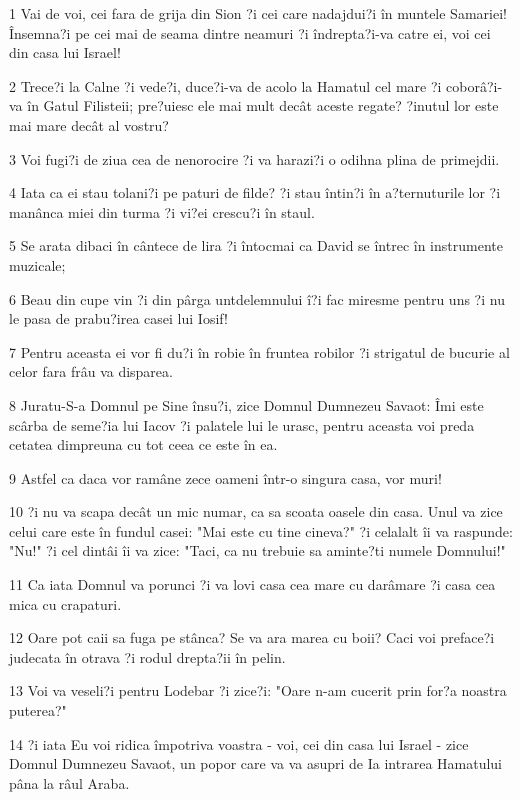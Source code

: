 \par 1 Vai de voi, cei fara de grija din Sion ?i cei care nadajdui?i în muntele Samariei! Însemna?i pe cei mai de seama dintre neamuri ?i îndrepta?i-va catre ei, voi cei din casa lui Israel!
\par 2 Trece?i la Calne ?i vede?i, duce?i-va de acolo la Hamatul cel mare ?i coborâ?i-va în Gatul Filisteii; pre?uiesc ele mai mult decât aceste regate? ?inutul lor este mai mare decât al vostru?
\par 3 Voi fugi?i de ziua cea de nenorocire ?i va harazi?i o odihna plina de primejdii.
\par 4 Iata ca ei stau tolani?i pe paturi de filde? ?i stau întin?i în a?ternuturile lor ?i manânca miei din turma ?i vi?ei crescu?i în staul.
\par 5 Se arata dibaci în cântece de lira ?i întocmai ca David se întrec în instrumente muzicale;
\par 6 Beau din cupe vin ?i din pârga untdelemnului î?i fac miresme pentru uns ?i nu le pasa de prabu?irea casei lui Iosif!
\par 7 Pentru aceasta ei vor fi du?i în robie în fruntea robilor ?i strigatul de bucurie al celor fara frâu va disparea.
\par 8 Juratu-S-a Domnul pe Sine însu?i, zice Domnul Dumnezeu Savaot: Îmi este scârba de seme?ia lui Iacov ?i palatele lui le urasc, pentru aceasta voi preda cetatea dimpreuna cu tot ceea ce este în ea.
\par 9 Astfel ca daca vor ramâne zece oameni într-o singura casa, vor muri!
\par 10 ?i nu va scapa decât un mic numar, ca sa scoata oasele din casa. Unul va zice celui care este în fundul casei: "Mai este cu tine cineva?" ?i celalalt îi va raspunde: "Nu!" ?i cel dintâi îi va zice: "Taci, ca nu trebuie sa aminte?ti numele Domnului!"
\par 11 Ca iata Domnul va porunci ?i va lovi casa cea mare cu darâmare ?i casa cea mica cu crapaturi.
\par 12 Oare pot caii sa fuga pe stânca? Se va ara marea cu boii? Caci voi preface?i judecata în otrava ?i rodul drepta?ii în pelin.
\par 13 Voi va veseli?i pentru Lodebar ?i zice?i: "Oare n-am cucerit prin for?a noastra puterea?"
\par 14 ?i iata Eu voi ridica împotriva voastra - voi, cei din casa lui Israel - zice Domnul Dumnezeu Savaot, un popor care va va asupri de Ia intrarea Hamatului pâna la râul Araba.

